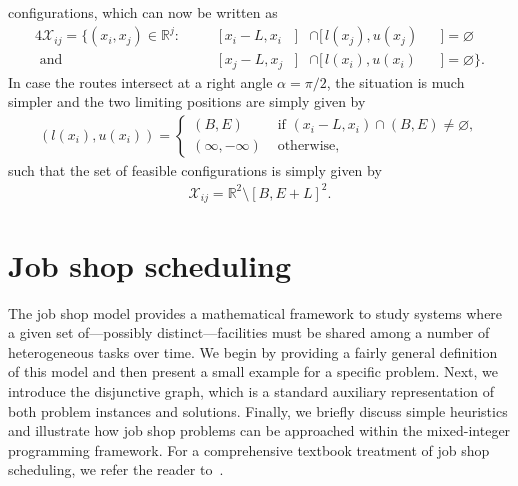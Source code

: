 \documentclass[a4paper]{report}
\theoremstyle{definition}
\theoremstyle{plain}
\begin{document}
configurations, which can now be written as
\begin{alignat}{4}
  \mathcal{X}_{ij} = \{ (x_{i}, x_{j}) \in \mathbb{R}^{j} :& \; &&[\,x_{i} - L,x_{i} &]& \cap [\,l(x_{j}), u(x_{j}) &&] = \varnothing \\
  \text{ and } & \, &&[\,x_{j} - L, x_{j} &]& \cap [\,l(x_{i}), u(x_{i}) &&] = \varnothing \} .
\end{alignat}
%
In case the routes intersect at a right angle $\alpha = \pi / 2$, the situation
is much simpler and the two limiting positions are simply given by
\begin{align}
  (l(x_{i}), u(x_{i})) =
  \begin{cases}
    (B,  E)    &\text{ if } (x_{i} - L, x_{i}) \cap (B, E) \neq \varnothing , \\
    (\infty, -\infty) &\text{ otherwise, }
  \end{cases}
\end{align}
such that the set of feasible configurations is simply given by
\begin{align}
  \mathcal{X}_{ij} = \mathbb{R}^{2} \setminus [B,E + L]^{2} .
\end{align}

\chapter{Job shop scheduling}\label{app:job-shop}

The job shop model provides a mathematical framework to study systems where a
given set of---possibly distinct---facilities must be shared among a number of
heterogeneous tasks over time.
%
We begin by providing a fairly general definition of this model and then present a
small example for a specific problem.
%
Next, we introduce the disjunctive graph, which is a standard auxiliary
representation of both problem instances and solutions.
%
Finally, we briefly discuss simple heuristics and illustrate how job shop
problems can be approached within the mixed-integer programming framework.
%
For a comprehensive textbook treatment of job shop scheduling, we refer the
reader to~\cite[Chapter 7]{pinedoSchedulingTheoryAlgorithms2016}.
\end{document}
